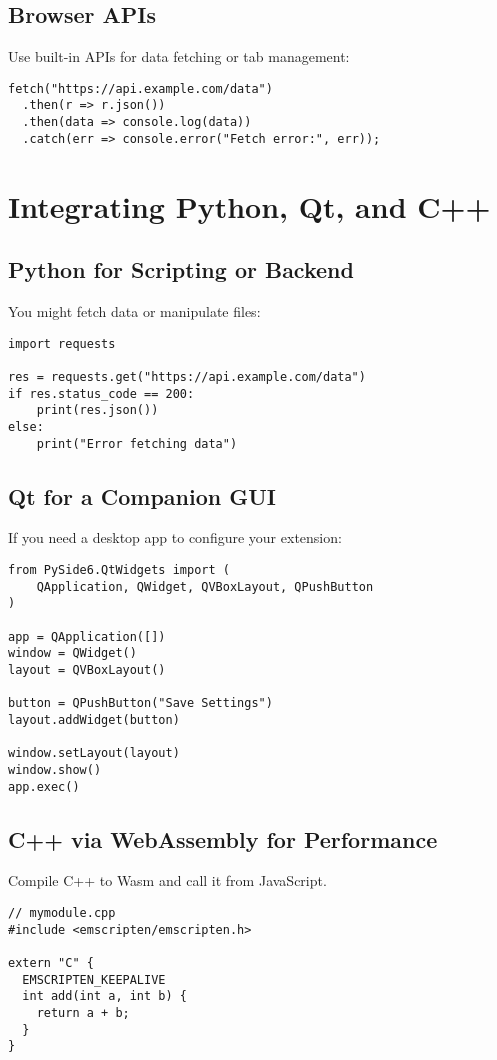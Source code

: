 \documentclass[12pt,a4paper]{article}
\begin{document}
\subsection{Browser APIs}
Use built-in APIs for data fetching or tab management:

\begin{verbatim}
fetch("https://api.example.com/data")
  .then(r => r.json())
  .then(data => console.log(data))
  .catch(err => console.error("Fetch error:", err));
\end{verbatim}

\section{Integrating Python, Qt, and C++}
\subsection{Python for Scripting or Backend}
You might fetch data or manipulate files:

\begin{verbatim}
import requests

res = requests.get("https://api.example.com/data")
if res.status_code == 200:
    print(res.json())
else:
    print("Error fetching data")
\end{verbatim}

\subsection{Qt for a Companion GUI}
If you need a desktop app to configure your extension:

\begin{verbatim}
from PySide6.QtWidgets import (
    QApplication, QWidget, QVBoxLayout, QPushButton
)

app = QApplication([])
window = QWidget()
layout = QVBoxLayout()

button = QPushButton("Save Settings")
layout.addWidget(button)

window.setLayout(layout)
window.show()
app.exec()
\end{verbatim}

\subsection{C++ via WebAssembly for Performance}
Compile C++ to Wasm and call it from JavaScript.

\begin{verbatim}
// mymodule.cpp
#include <emscripten/emscripten.h>

extern "C" {
  EMSCRIPTEN_KEEPALIVE
  int add(int a, int b) {
    return a + b;
  }
}
\end{verbatim}
\end{document}
